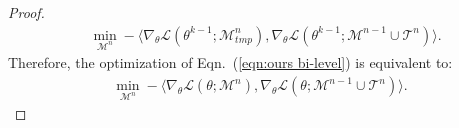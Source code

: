 \documentclass[table, xcdraw]{article}
\theoremstyle{plain}
\theoremstyle{definition}
\theoremstyle{remark}
\begin{document}
\begin{proof}
\begin{equation}
\begin{aligned}
        & \min_{\mathcal{M}^n}-\langle \nabla_\theta \mathcal{L}(\theta^{k-1}; \mathcal{M}^n_{tmp}),\nabla_\theta \mathcal{L}(\theta^{k-1}; \mathcal{M}^{n-1} \cup \mathcal{T}^n) \rangle.
    \label{theorem}
\end{aligned}
\end{equation}
Therefore, the optimization of Eqn.~(\ref{eqn:ours bi-level}) is equivalent to: 
\begin{equation}
\begin{aligned} 
         \underset{\mathcal{M}^n}{\min}-\langle \nabla_\theta \mathcal{L}(\theta; \mathcal{M}^n),\nabla_\theta \mathcal{L}(\theta; \mathcal{M}^{n-1} \cup \mathcal{T}^n) \rangle .
    \label{theorem}
\end{aligned}
\end{equation}
\end{proof}
\end{document}
